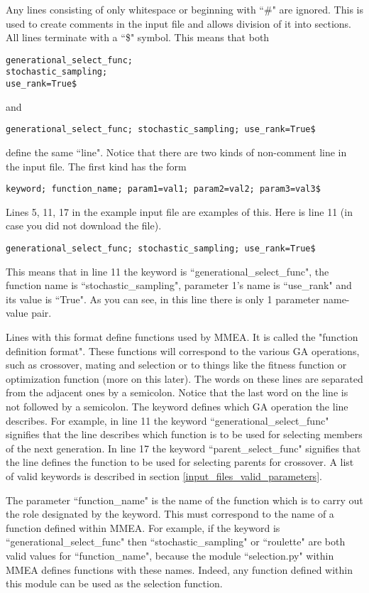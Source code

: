 \documentclass{article}
\begin{document}
Any lines consisting of only whitespace or beginning with ``\#" are ignored. This is used to create comments in the input file and allows division of it into sections. All lines terminate with a ``\$" symbol. This means that both
\begin{verbatim}
generational_select_func; 
stochastic_sampling; 
use_rank=True$
\end{verbatim}
and
\begin{verbatim}
generational_select_func; stochastic_sampling; use_rank=True$
\end{verbatim}
define the same ``line". Notice that there are two kinds of non-comment line in the input file. The first kind has the form
\begin{verbatim}
keyword; function_name; param1=val1; param2=val2; param3=val3$
\end{verbatim}
Lines 5, 11, 17 in the example input file are examples of this. Here is line 11 (in case you did not download the file).
\begin{verbatim}
generational_select_func; stochastic_sampling; use_rank=True$
\end{verbatim}
This means that in line 11 the keyword is ``generational\_select\_func", the function name is ``stochastic\_sampling", parameter 1's name is ``use\_rank" and its value is ``True". As you can see, in this line there is only 1 parameter name-value pair.

Lines with this format define functions used by MMEA. It is called the "function definition format". These functions will correspond to the various GA operations, such as crossover, mating and selection or to things like the fitness function or optimization function (more on this later). The words on these lines are separated from the adjacent ones by a semicolon. Notice that the last word on the line is not followed by a semicolon. The keyword defines which GA operation the line describes. For example, in line 11 the keyword ``generational\_select\_func" signifies that the line describes which function is to be used for selecting members of the next generation. In line 17 the keyword ``parent\_select\_func" signifies that the line defines the function to be used for selecting parents for crossover. A list of valid keywords is described in section \ref{input_files_valid_parameters}.

The parameter ``function\_name" is the name of the function which is to carry out the role designated by the keyword. This must correspond to the name of a function defined within MMEA. For example, if the keyword is ``generational\_select\_func" then ``stochastic\_sampling" or ``roulette" are both valid values for ``function\_name", because the module ``selection.py" within MMEA defines functions with these names. Indeed, any function defined within this module can be used as the selection function.
\end{document}

